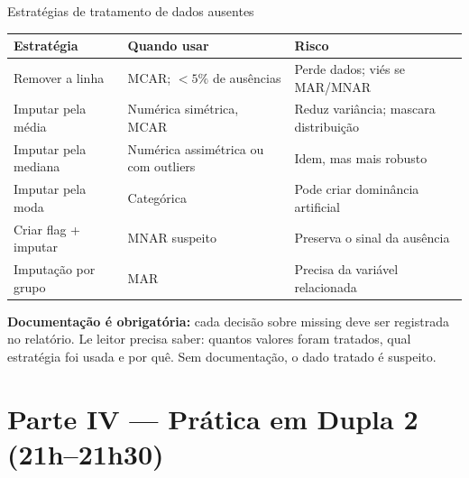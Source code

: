\begin{FormulaBox}{Estratégias de tratamento de dados ausentes}
\begin{tabular}{|l|p{5cm}|p{5cm}|}
\hline
\textbf{Estratégia} & \textbf{Quando usar} & \textbf{Risco} \\
\hline
Remover a linha & MCAR; $<\!5\%$ de ausências & Perde dados; viés se MAR/MNAR \\
Imputar pela média & Numérica simétrica, MCAR & Reduz variância; mascara distribuição \\
Imputar pela mediana & Numérica assimétrica ou com outliers & Idem, mas mais robusto \\
Imputar pela moda & Categórica & Pode criar dominância artificial \\
Criar flag + imputar & MNAR suspeito & Preserva o sinal da ausência \\
Imputação por grupo & MAR & Precisa da variável relacionada \\
\hline
\end{tabular}
\end{FormulaBox}

\begin{NoteBox}
\textbf{Documentação é obrigatória:} cada decisão sobre missing deve ser
registrada no relatório. Le leitor precisa saber: quantos valores foram
tratados, qual estratégia foi usada e por quê. Sem documentação, o dado
tratado é suspeito.
\end{NoteBox}

\section{Parte IV — Prática em Dupla 2 (21h–21h30)}

